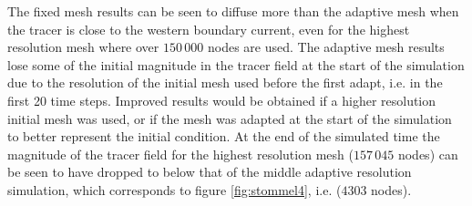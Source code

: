 
The fixed mesh results can be seen to diffuse more than the adaptive mesh
when the tracer is close to the western boundary current, even for the highest resolution mesh
where over $150\,000$ nodes are used. The adaptive mesh results lose
some of the initial magnitude in the tracer field at the start of the simulation due to the resolution of the
initial mesh used before the first adapt, i.e. in the first 20 time steps.
Improved results would be obtained if a higher resolution initial mesh was used,
or if the mesh was adapted at the start of the simulation to better represent the initial condition.
At the end of the simulated time the magnitude of the tracer field for the highest resolution mesh ($157\, 045$ nodes)
can be seen to have dropped to below that of the middle adaptive resolution simulation, which corresponds to
figure \ref{fig:stommel4}, i.e. ($4303$ nodes).


